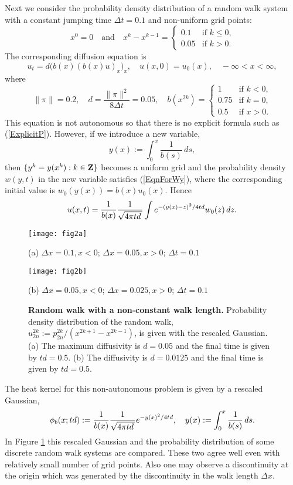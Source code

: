 \documentclass[11pt]{amsart}
\def\d{d}
\def\Z{{\bf Z}}
\begin{document}
Next we consider the probability density distribution of a random walk system with a constant jumping time $\Delta t=0.1$ and non-uniform grid points:
\[
x^0=0\quad\text{and}\quad x^k-x^{k-1}=
\begin{cases}
0.1 & \text{if $k\leq 0$,}\\
0.05 & \text{if $k>0$.}
\end{cases}\]
The corresponding diffusion equation is
\begin{equation*}\label{EqnForU2}
u_t=\d \big(b(x)(b(x)u)_x \big)_x,\quad u(x,0)=u_0(x),\quad -\infty<x<\infty,
\end{equation*}
where
$$
\|\pi\|=0.2, \quad \d=\frac{\|\pi\|^2}{8\Delta t}=0.05, \quad b(x^{2k})=
\begin{cases}
1 & \text{if $k<0$,}\\
0.75 & \text{if $k=0$,}\\
0.5 & \text{if $x>0$.}
\end{cases}
$$
This equation is not autonomous so that there is no explicit formula such as (\ref{ExplicitP}). However, if we introduce a new variable,
\[y(x) := \int_0^{x}\frac{1}{b(s)}\,ds,\]
then $\{y^k=y(x^k):k\in\Z\}$ becomes a uniform grid and the probability density $w(y,t)$ in the new variable satisfies (\ref{EqnForWy}), where the corresponding initial value is $w_0(y(x))=b(x)u_0(x)$. Hence
\begin{equation*}\label{000}
u(x,t)={1\over b(x)} \frac{1}{\sqrt{4\pi t\d\,}} \int e^{-(y(x)-z)^2/4t\d} w_0(z)\,dz.
\end{equation*}

\begin{figure}[ht]
\centering
\begin{minipage}[t]{0.48\textwidth}
\centering
\texttt{[image: fig2a]}

(a) $\Delta x=0.1, x<0$; $\Delta x=0.05, x>0$; $\Delta t=0.1$
\end{minipage}
\begin{minipage}[t]{0.48\textwidth}
 \centering
 \texttt{[image: fig2b]}

(b) $\Delta x=0.05, x<0$; $\Delta x=0.025, x>0$; $\Delta t=0.1$
\end{minipage}
\caption{{\bf Random walk with a non-constant walk length.} Probability density distribution of the random walk, $u^{2k}_{2n}:=p^{2k}_{2n}/(x^{2k+1}-x^{2k-1})$, is given with the rescaled Gaussian. (a) The maximum diffusivity is $\d=0.05$ and the final time is given by $t\d=0.5$.  (b) The diffusivity is $\d=0.0125$ and the final time is given by $t\d=0.5$. } \label{fig2}
\end{figure}
The heat kernel for this non-autonomous problem is given by a rescaled Gaussian,
\begin{equation*}
\phi_b(x;t\d) := {1\over b(x)}\frac{1}{\sqrt{4\pi t\d\,}}e^{-y(x)^2/4t\d},\quad y(x) := \int_0^{x}\frac{1}{b(s)}\,ds.
\end{equation*}
In Figure \ref{fig2} this rescaled Gaussian and the probability distribution of some discrete random walk systems are compared. These two agree well even with relatively small number of grid points. Also one may observe a discontinuity at the origin which was generated by the discontinuity in the walk length $\Delta x$.
\end{document}
